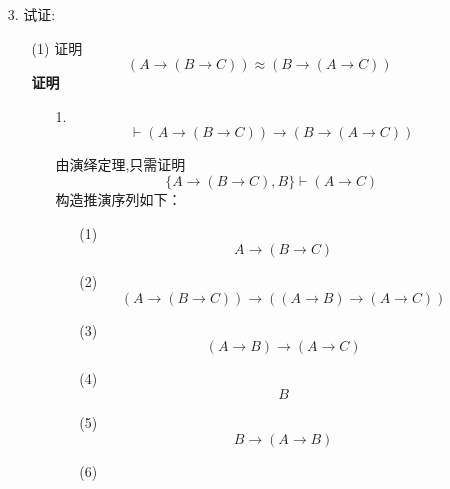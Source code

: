 \documentclass[11pt,oneside,a4paper]{article}
\begin{document}
\begin{itemize}
\begin{itemize}
        \end{itemize}
    \item[3.] 试证:
        \begin{itemize}
            \item[(1)]   证明\[(A \to (B \to C)) \approx (B \to (A \to C))\]
            \textbf{证明} 
            \begin{itemize}
                \item[1.] \[  \vdash  (A \to (B \to C)) \to (B \to (A \to C)) \] \par
                    由演绎定理,只需证明 
                                \[ \{A \to (B \to C),B\} \vdash (A \to C) \]
                    构造推演序列如下：
                    \begin{enumerate}
                        \item[(1)] 
                                \begin{equation*}
                                     A \to (B \to C)             \tag*{$\varGamma$}
                                \end{equation*}                    
                        \item[(2)] 
                                \begin{equation*}
                                    (A \to (B \to C)) \to ((A \to B) \to (A \to C)) \tag*{L2}
                                \end{equation*}
                        \item[(3)]
                                \begin{equation*}
                                   (A \to B) \to (A \to C)      \tag*{MP(1,2)}
                                \end{equation*}
                        \item[(4)]
                                \begin{equation*}
                                    B                           \tag*{$\varGamma$}
                                \end{equation*}
                        \item[(5)]
                                \begin{equation*}
                                        B \to (A \to B)         \tag*{L1}
                                \end{equation*}
                        \item[(6)]
                                \begin{equation*}

\end{equation*}
\end{enumerate}
\end{itemize}
\end{itemize}
\end{itemize}
\end{document}
